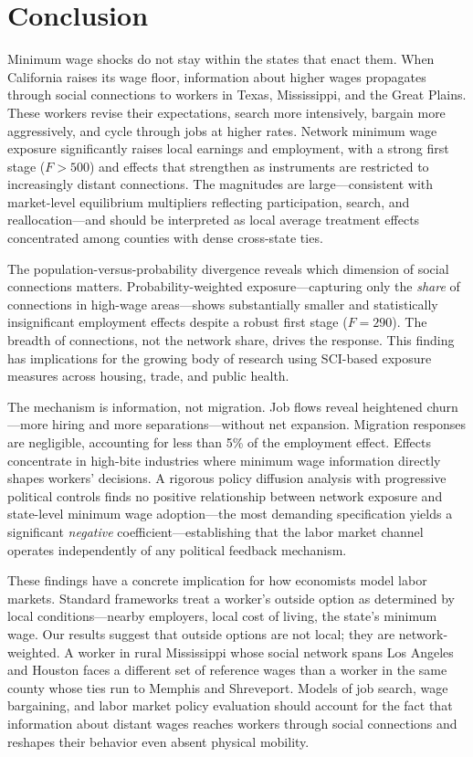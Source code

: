 \documentclass[12pt]{article}
\begin{document}
\section{Conclusion}
\label{sec:conclusion}

Minimum wage shocks do not stay within the states that enact them. When California raises its wage floor, information about higher wages propagates through social connections to workers in Texas, Mississippi, and the Great Plains. These workers revise their expectations, search more intensively, bargain more aggressively, and cycle through jobs at higher rates. Network minimum wage exposure significantly raises local earnings and employment, with a strong first stage ($F > 500$) and effects that strengthen as instruments are restricted to increasingly distant connections. The magnitudes are large---consistent with market-level equilibrium multipliers reflecting participation, search, and reallocation---and should be interpreted as local average treatment effects concentrated among counties with dense cross-state ties.

The population-versus-probability divergence reveals which dimension of social connections matters. Probability-weighted exposure---capturing only the \textit{share} of connections in high-wage areas---shows substantially smaller and statistically insignificant employment effects despite a robust first stage ($F = 290$). The breadth of connections, not the network share, drives the response. This finding has implications for the growing body of research using SCI-based exposure measures across housing, trade, and public health.

The mechanism is information, not migration. Job flows reveal heightened churn---more hiring and more separations---without net expansion. Migration responses are negligible, accounting for less than 5\% of the employment effect. Effects concentrate in high-bite industries where minimum wage information directly shapes workers' decisions. A rigorous policy diffusion analysis with progressive political controls finds no positive relationship between network exposure and state-level minimum wage adoption---the most demanding specification yields a significant \textit{negative} coefficient---establishing that the labor market channel operates independently of any political feedback mechanism.

These findings have a concrete implication for how economists model labor markets. Standard frameworks treat a worker's outside option as determined by local conditions---nearby employers, local cost of living, the state's minimum wage. Our results suggest that outside options are not local; they are network-weighted. A worker in rural Mississippi whose social network spans Los Angeles and Houston faces a different set of reference wages than a worker in the same county whose ties run to Memphis and Shreveport. Models of job search, wage bargaining, and labor market policy evaluation should account for the fact that information about distant wages reaches workers through social connections and reshapes their behavior even absent physical mobility.
\end{document}
